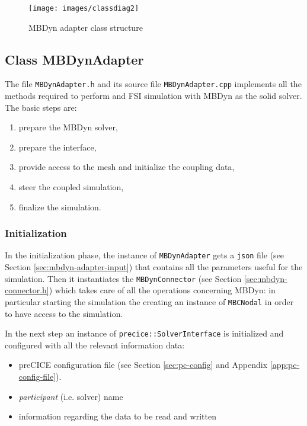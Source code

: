 \begin{figure}[htbp!]
	\centering
	\texttt{[image: images/classdiag2]}
	\caption{MBDyn adapter class structure}
	\label{fig:adapter-classdiag}
\end{figure}


\subsection{Class MBDynAdapter}
\label{sec:mbdyn-adapter.h}

The file \texttt{MBDynAdapter.h} and its source file \texttt{MBDynAdapter.cpp} implements all the methods required to perform and FSI simulation with MBDyn as the solid solver. The basic steps are:

\begin{enumerate}
	\item prepare the MBDyn solver,
	\item prepare the interface,
	\item provide access to the mesh and initialize the coupling data,
	\item steer the coupled simulation,
	\item finalize the simulation.
\end{enumerate}

\subsubsection{Initialization}

In the initialization phase, the instance of \texttt{MBDynAdapter} gets a \texttt{json} file (see Section \ref{sec:mbdyn-adapter-input}) that contains all the parameters useful for the simulation.
Then it instantiates the \texttt{MBDynConnector} (see Section \ref{sec:mbdyn-connector.h}) which takes care of all the operations concerning MBDyn: in particular starting the simulation the creating an instance of \texttt{MBCNodal} in order to have access to the simulation.

In the next step an instance of \texttt{precice::SolverInterface} is initialized and configured with all the relevant information data:

\begin{itemize}
	\item preCICE configuration file (see Section \ref{sec:pc-config} and Appendix \ref{app:pc-config-file}).
	\item \textit{participant} (i.e. solver) name
	\item information regarding the data to be read and written
\end{itemize} 

